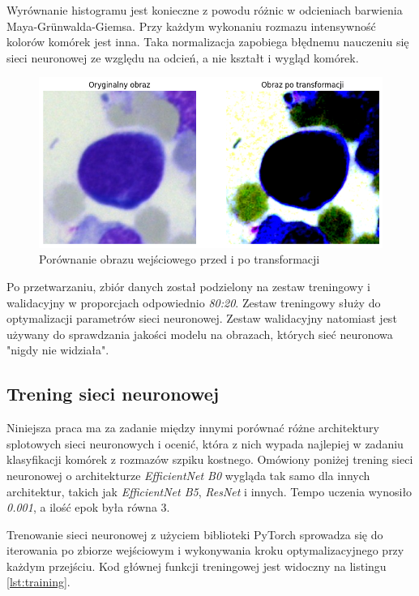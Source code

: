 Wyrównanie histogramu jest konieczne z powodu różnic w odcieniach barwienia Maya-Grünwalda-Giemsa.
Przy każdym wykonaniu rozmazu intensywność kolorów komórek jest inna.
Taka normalizacja zapobiega błędnemu nauczeniu się sieci neuronowej ze względu na odcień, a nie kształt i wygląd komórek.

\begin{figure}
    \centering
    \includegraphics[width=\textwidth]{image_transform}
    \caption{Porównanie obrazu wejściowego przed i po transformacji}
    \label{fig:transformations_example}
\end{figure}

Po przetwarzaniu, zbiór danych został podzielony na zestaw treningowy i walidacyjny w proporcjach odpowiednio \textit{80:20}.
Zestaw treningowy służy do optymalizacji parametrów sieci neuronowej.
Zestaw walidacyjny natomiast jest używany do sprawdzania jakości modelu na obrazach, których sieć neuronowa "nigdy nie widziała".

\subsection{Trening sieci neuronowej}

Niniejsza praca ma za zadanie między innymi porównać różne architektury splotowych sieci neuronowych i ocenić,
która z nich wypada najlepiej w zadaniu klasyfikacji komórek z rozmazów szpiku kostnego.
Omówiony poniżej trening sieci neuronowej o architekturze \textit{EfficientNet B0} wygląda tak samo dla innych architektur, takich jak \textit{EfficientNet B5}, \textit{ResNet} i innych.
Tempo uczenia wynosiło \textit{0.001}, a ilość epok była równa 3.

Trenowanie sieci neuronowej z użyciem biblioteki PyTorch sprowadza się do iterowania po zbiorze wejściowym i wykonywania kroku optymalizacyjnego przy każdym przejściu.
Kod głównej funkcji treningowej jest widoczny na listingu \ref{lst:training}.

